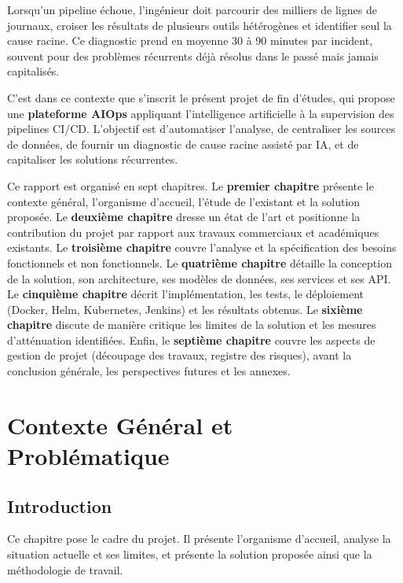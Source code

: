\documentclass[12pt,a4paper,oneside]{report}
\begin{document}
Lorsqu'un pipeline échoue, l'ingénieur doit parcourir des milliers de lignes de journaux, croiser les résultats de plusieurs outils hétérogènes et identifier seul la cause racine. Ce diagnostic prend en moyenne 30 à 90 minutes par incident, souvent pour des problèmes récurrents déjà résolus dans le passé mais jamais capitalisés.

C'est dans ce contexte que s'inscrit le présent projet de fin d'études, qui propose une \textbf{plateforme AIOps} appliquant l'intelligence artificielle à la supervision des pipelines CI/CD. L'objectif est d'automatiser l'analyse, de centraliser les sources de données, de fournir un diagnostic de cause racine assisté par IA, et de capitaliser les solutions récurrentes.

Ce rapport est organisé en sept chapitres. Le \textbf{premier chapitre} présente le contexte général, l'organisme d'accueil, l'étude de l'existant et la solution proposée. Le \textbf{deuxième chapitre} dresse un état de l'art et positionne la contribution du projet par rapport aux travaux commerciaux et académiques existants. Le \textbf{troisième chapitre} couvre l'analyse et la spécification des besoins fonctionnels et non fonctionnels. Le \textbf{quatrième chapitre} détaille la conception de la solution, son architecture, ses modèles de données, ses services et ses API. Le \textbf{cinquième chapitre} décrit l'implémentation, les tests, le déploiement (Docker, Helm, Kubernetes, Jenkins) et les résultats obtenus. Le \textbf{sixième chapitre} discute de manière critique les limites de la solution et les mesures d'atténuation identifiées. Enfin, le \textbf{septième chapitre} couvre les aspects de gestion de projet (découpage des travaux, registre des risques), avant la conclusion générale, les perspectives futures et les annexes.

\chapter{Contexte Général et Problématique}\label{chap:context}
\section{Introduction}
Ce chapitre pose le cadre du projet. Il présente l'organisme d'accueil, analyse la situation actuelle et ses limites, et présente la solution proposée ainsi que la méthodologie de travail.
\end{document}
